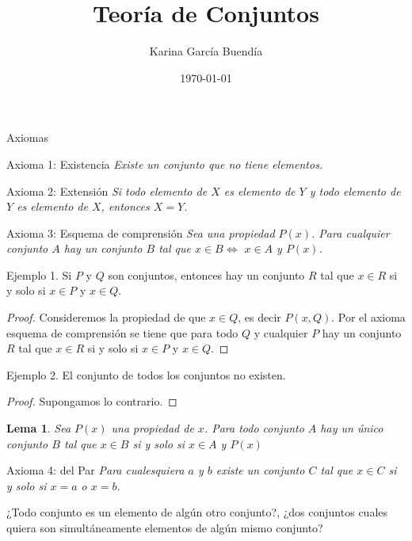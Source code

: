 \documentclass{beamer}
\title{Teoría de Conjuntos}
\author{Karina García Buendía}
\date{\today}
\newtheorem{lema}{Lema}
\begin{document}
\begin{frame}
\titlepage
\end{frame}

\begin{frame}{Axiomas}
    \begin{block}{Axioma 1: Existencia}
        \textit {Existe un conjunto que no tiene elementos.}
    \end{block}

    \begin{block}{Axioma 2: Extensión}
         \textit {Si todo elemento de $X$ es elemento de $Y$ y todo elemento de $Y$ es elemento de $X$, entonces
         $X =Y$.}
    \end{block}

        \begin{block}{Axioma 3: Esquema de comprensión}
            \textit {Sea una propiedad $P(x)$. Para cualquier conjunto $A$ hay un conjunto $B$ tal que $x \in B \Leftrightarrow$
            $x \in A$ y $P(x)$.} 
        \end{block}
\end{frame}

\begin{frame}
    Ejemplo 1. Si $P$ y $Q$ son conjuntos, entonces hay un conjunto $R$ tal que $x \in R$
    si y solo si $x \in P$ y $x \in Q$.
\pause
    \begin{proof}
        Consideremos la propiedad de que $x \in Q$, es decir $P(x,Q)$. Por el axioma esquema de comprensión se tiene
        que para todo $Q$ y cualquier $P$ hay un conjunto $R$ tal que $x \in R$ si y solo si $x \in P$ y $x \in Q$.
    \end{proof}    
\pause
    Ejemplo 2. El conjunto de todos los conjuntos no existen.
    \begin{proof}
        Supongamos lo contrario.
    \end{proof}
\end{frame}

\begin{frame}
    \begin{lema}
        Sea $P(x)$ una propiedad de $x$. Para todo conjunto $A$ hay un único conjunto $B$ tal que $x \in B$
        si y solo si $x \in A$ y $P(x)$
    \end{lema}
\end{frame}

\begin{frame}
        \begin{block}{Axioma 4: del Par}
            \textit {Para cualesquiera $a$ y $b$ existe un conjunto $C$ tal que $x \in C$ si y solo si $x = a$ o $x = b$.}
        \end{block}

\pause

\vspace{1em}
     ¿Todo conjunto es un elemento de algún otro conjunto?, ¿dos conjuntos cuales quiera son simultáneamente elementos
     de algún mismo conjunto?
\end{frame}
\end{document}
